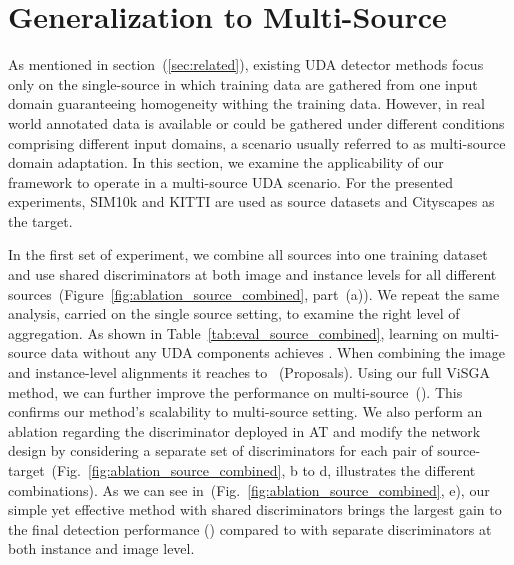\documentclass[10pt,twocolumn,letterpaper]{article}
\def\ourda{ViSGA\xspace}
\begin{document}
 











 


\section{Generalization to Multi-Source}
\label{sec:generalization}


As mentioned in section~(\ref{sec:related}), existing UDA detector methods focus only on the single-source in which training data are gathered from one input domain guaranteeing homogeneity withing the training data. However, in real world annotated data is available or could be gathered under different conditions comprising different input domains, a scenario usually referred to as multi-source domain adaptation. In this section, we examine the applicability of our framework to operate in a multi-source UDA scenario. For the presented experiments, SIM10k and KITTI are used as source datasets and Cityscapes as the target. 

In the first set of experiment, we combine all sources into one training dataset and use shared discriminators at both image and instance levels for all different sources~(Figure~\ref{fig:ablation_source_combined}, part~(a)). We repeat the same analysis, carried on the single source setting, to examine the right level of aggregation. As shown in Table~\ref{tab:eval_source_combined}, learning on multi-source data without any UDA components achieves .  When combining the image and instance-level alignments it reaches to ~(Proposals). Using our full \ourda method, we can further improve the performance on multi-source~(). This confirms our method's scalability to multi-source setting. We also perform an ablation regarding the discriminator deployed in AT and modify the network design by 
considering a separate set of discriminators for each pair of source-target~(Fig.~\ref{fig:ablation_source_combined}, b to d, illustrates the different combinations).  
As we can see in~(Fig.~\ref{fig:ablation_source_combined}, e), our simple yet effective method with shared discriminators brings the largest gain to the final detection performance () compared to  with separate discriminators at both instance and image level.
\end{document}
